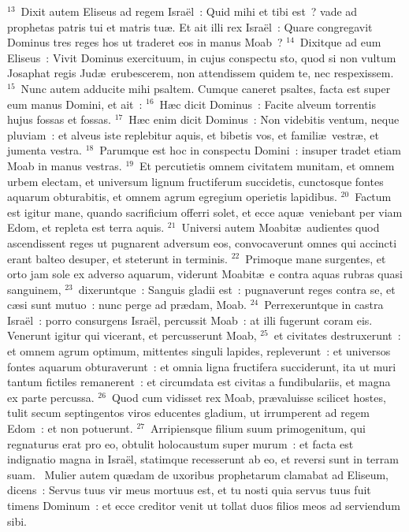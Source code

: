 ${}^{13}$~Dixit autem Eliseus ad regem Isra\"el~: Quid mihi et tibi est~? vade ad prophetas patris tui et matris tu\ae . Et ait illi rex Isra\"el~: Quare congregavit Dominus tres reges hos ut traderet eos in manus Moab~?
${}^{14}$~Dixitque ad eum Eliseus~: Vivit Dominus exercituum, in cujus conspectu sto, quod si non vultum Josaphat regis Jud\ae\ erubescerem, non attendissem quidem te, nec respexissem.
${}^{15}$~Nunc autem adducite mihi psaltem. Cumque caneret psaltes, facta est super eum manus Domini, et ait~:
${}^{16}$~H\ae c dicit Dominus~: Facite alveum torrentis hujus fossas et fossas.
${}^{17}$~H\ae c enim dicit Dominus~: Non videbitis ventum, neque pluviam~: et alveus iste replebitur aquis, et bibetis vos, et famili\ae\ vestr\ae , et jumenta vestra.
${}^{18}$~Parumque est hoc in conspectu Domini~: insuper tradet etiam Moab in manus vestras.
${}^{19}$~Et percutietis omnem civitatem munitam, et omnem urbem electam, et universum lignum fructiferum succidetis, cunctosque fontes aquarum obturabitis, et omnem agrum egregium operietis lapidibus.
${}^{20}$~Factum est igitur mane, quando sacrificium offerri solet, et ecce aqu\ae\ veniebant per viam Edom, et repleta est terra aquis.
${}^{21}$~Universi autem Moabit\ae\ audientes quod ascendissent reges ut pugnarent adversum eos, convocaverunt omnes qui accincti erant balteo desuper, et steterunt in terminis.
${}^{22}$~Primoque mane surgentes, et orto jam sole ex adverso aquarum, viderunt Moabit\ae\ e contra aquas rubras quasi sanguinem,
${}^{23}$~dixeruntque~: Sanguis gladii est~: pugnaverunt reges contra se, et c\ae si sunt mutuo~: nunc perge ad pr\ae dam, Moab.
${}^{24}$~Perrexeruntque in castra Isra\"el~: porro consurgens Isra\"el, percussit Moab~: at illi fugerunt coram eis. Venerunt igitur qui vicerant, et percusserunt Moab,
${}^{25}$~et civitates destruxerunt~: et omnem agrum optimum, mittentes singuli lapides, repleverunt~: et universos fontes aquarum obturaverunt~: et omnia ligna fructifera succiderunt, ita ut muri tantum fictiles remanerent~: et circumdata est civitas a fundibulariis, et magna ex parte percussa.
${}^{26}$~Quod cum vidisset rex Moab, pr\ae valuisse scilicet hostes, tulit secum septingentos viros educentes gladium, ut irrumperent ad regem Edom~: et non potuerunt.
${}^{27}$~Arripiensque filium suum primogenitum, qui regnaturus erat pro eo, obtulit holocaustum super murum~: et facta est indignatio magna in Isra\"el, statimque recesserunt ab eo, et reversi sunt in terram suam.
~Mulier autem qu\ae dam de uxoribus prophetarum clamabat ad Eliseum, dicens~: Servus tuus vir meus mortuus est, et tu nosti quia servus tuus fuit timens Dominum~: et ecce creditor venit ut tollat duos filios meos ad serviendum sibi.

